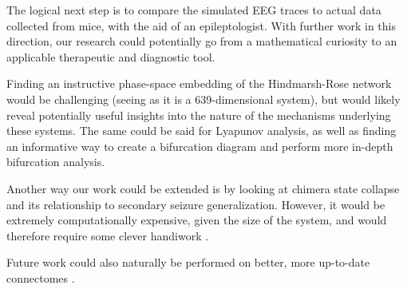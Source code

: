 The logical next step is to compare the simulated EEG traces to actual data collected from mice, with the aid of an epileptologist.
With further work in this direction, our research could potentially go from a mathematical curiosity to an applicable therapeutic and diagnostic tool.

Finding an instructive phase-space embedding of the Hindmarsh-Rose network would be challenging (seeing as it is a 639-dimensional system),
but would likely reveal potentially useful insights into the nature of the mechanisms underlying these systems.
The same could be said for Lyapunov analysis, as well as finding an informative way to create a bifurcation diagram and perform more in-depth bifurcation analysis.

Another way our work could be extended is by looking at chimera state collapse and its relationship to secondary seizure generalization.
However, it would be extremely computationally expensive, given the size of the system, and would therefore require some clever handiwork \cite{Wolfrum2011}.

Future work could also naturally be performed on better, more up-to-date connectomes \cite{Knox2019}.

